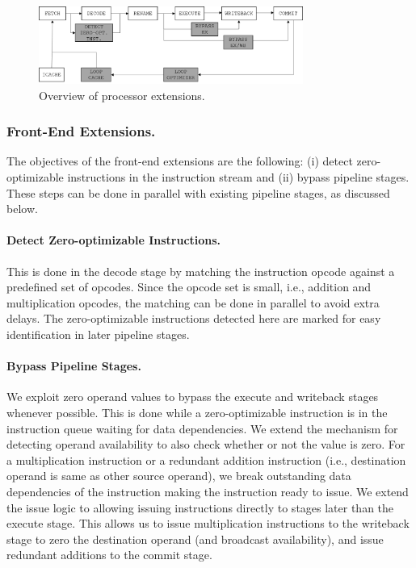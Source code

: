 \begin{figure}
\centering
\includegraphics[height=1in]{Figures/pipeline.png}
\caption{Overview of processor extensions.}
\label{fig:opt_pipeline}
\end{figure}

\subsubsection{Front-End Extensions.}
The objectives of the front-end extensions are the following: (i) detect zero-optimizable instructions in the instruction stream and (ii) bypass pipeline stages.  These steps can be done in parallel with existing pipeline stages, as discussed below.  

\paragraph{Detect Zero-optimizable Instructions.}
This is done in the decode stage by matching the instruction opcode against a predefined set of opcodes. Since the opcode set is small, i.e., addition and multiplication opcodes, the matching can be done in parallel to avoid extra delays.  The zero-optimizable instructions detected here are marked for easy identification in later pipeline stages. 

\paragraph{Bypass Pipeline Stages.}
We exploit zero operand values to bypass the execute and writeback stages whenever possible.  This is done while a zero-optimizable instruction is in the instruction queue waiting for data dependencies.  We extend the mechanism for detecting operand availability to also check whether or not the value is zero.  For a multiplication instruction or a redundant addition instruction (i.e., destination operand is same as other source operand), we break outstanding data dependencies of the instruction making the instruction ready to issue.  We extend the issue logic to allowing issuing instructions directly to stages later than the execute stage.  This allows us to issue multiplication instructions to the writeback stage to zero the destination operand (and broadcast availability), and issue redundant additions to the commit stage.   

